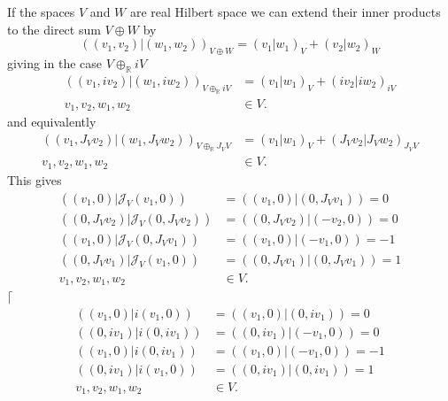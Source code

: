 \documentclass[aps,preprint]{revtex4}
\begin{document}
If the spaces $V$ and $W$ are real Hilbert space we can extend their inner
products to the direct sum $V\oplus W$ by 
\begin{equation}
\left( \left. \left( v_{1},v_{2}\right) \right\vert \left(
w_{1},w_{2}\right) \right) _{V\oplus W}=\left( \left. v_{1}\right\vert
w_{1}\right) _{V}+\left( \left. v_{2}\right\vert w_{2}\right) _{W}
\end{equation}
giving in the case $V\oplus_{\mathbb{R}}iV$ 
\begin{align}
\left( \left. \left( v_{1},iv_{2}\right) \right\vert \left(
w_{1},iw_{2}\right) \right) _{V\oplus_{\mathbb{R}}iV} & =\left( \left.
v_{1}\right\vert w_{1}\right) _{V}+\left( \left. iv_{2}\right\vert
iw_{2}\right) _{iV} \\
v_{1},v_{2},w_{1},w_{2} & \in V.
\end{align}
and equivalently%
\begin{align}
\left( \left. \left( v_{1},J_{V}v_{2}\right) \right\vert \left(
w_{1},J_{V}w_{2}\right) \right) _{V\oplus_{\mathbb{R}}J_{V}V} & =\left(
\left. v_{1}\right\vert w_{1}\right) _{V}+\left( \left.
J_{V}v_{2}\right\vert J_{V}w_{2}\right) _{J_{V}V} \\
v_{1},v_{2},w_{1},w_{2} & \in V.
\end{align}
This gives 
\begin{align}
\left( \left. \left( v_{1},0\right) \right\vert \mathcal{J}_{V}\left(
v_{1},0\right) \right) & =\left( \left. \left( v_{1},0\right) \right\vert
\left( 0,J_{V}v_{1}\right) \right) =0 \\
\left( \left. \left( 0,J_{V}v_{2}\right) \right\vert \mathcal{J}_{V}\left(
0,J_{V}v_{2}\right) \right) & =\left( \left. \left( 0,J_{V}v_{2}\right)
\right\vert \left( -v_{2},0\right) \right) =0 \\
\left( \left. \left( v_{1},0\right) \right\vert \mathcal{J}_{V}\left(
0,J_{V}v_{1}\right) \right) & =\left( \left. \left( v_{1},0\right)
\right\vert \left( -v_{1},0\right) \right) =-1 \\
\left( \left. \left( 0,J_{V}v_{1}\right) \right\vert \mathcal{J}_{V}\left(
v_{1},0\right) \right) & =\left( \left. \left( 0,J_{V}v_{1}\right)
\right\vert \left( 0,J_{V}v_{1}\right) \right) =1 \\
v_{1},v_{2},w_{1},w_{2} & \in V.
\end{align}
$\lceil$%
\begin{align}
\left( \left. \left( v_{1},0\right) \right\vert i\left( v_{1},0\right)
\right) & =\left( \left. \left( v_{1},0\right) \right\vert \left(
0,iv_{1}\right) \right) =0 \\
\left( \left. \left( 0,iv_{1}\right) \right\vert i\left( 0,iv_{1}\right)
\right) & =\left( \left. \left( 0,iv_{1}\right) \right\vert \left(
-v_{1},0\right) \right) =0 \\
\left( \left. \left( v_{1},0\right) \right\vert i\left( 0,iv_{1}\right)
\right) & =\left( \left. \left( v_{1},0\right) \right\vert \left(
-v_{1},0\right) \right) =-1 \\
\left( \left. \left( 0,iv_{1}\right) \right\vert i\left( v_{1},0\right)
\right) & =\left( \left. \left( 0,iv_{1}\right) \right\vert \left(
0,iv_{1}\right) \right) =1 \\
v_{1},v_{2},w_{1},w_{2} & \in V.
\end{align}
\end{document}
